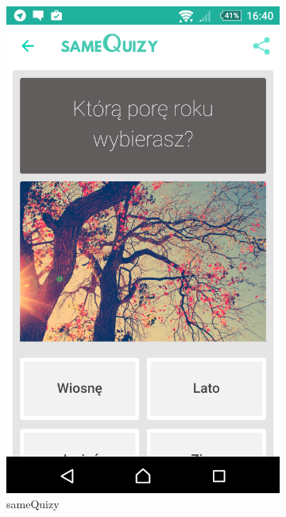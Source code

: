 \documentclass[eng]{mgr}
\begin{document}
\begin{figure}[ht]
\begin{subfigure}{.3\textwidth}
			\end{subfigure}
			\begin{subfigure}{.3\textwidth}
				\centering
				\includegraphics[width=.7\linewidth]{sameQuizy.png}
				\caption{sameQuizy}
				\label{fig:same_quizy}
			\end{subfigure}
			\begin{subfigure}{.3\textwidth}
				\centering

\end{subfigure}
\end{figure}
\end{document}
